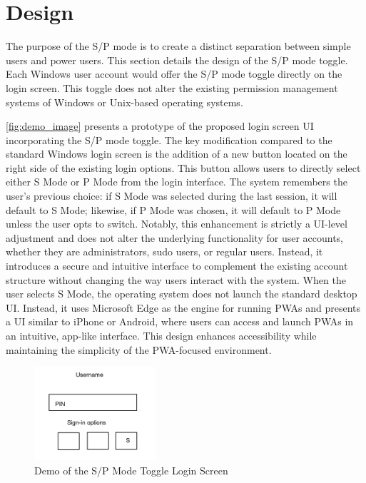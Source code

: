 \section{Design}
\label{sec:methodology}

The purpose of the S/P mode is to create a distinct separation between simple users and power users. This section details the design of the S/P mode toggle. Each Windows user account would offer the S/P mode toggle directly on the login screen. This toggle does not alter the existing permission management systems of Windows or Unix-based operating systems.

\autoref{fig:demo_image} presents a prototype of the proposed login screen UI incorporating the S/P mode toggle. The key modification compared to the standard Windows login screen is the addition of a new button located on the right side of the existing login options. This button allows users to directly select either S Mode or P Mode from the login interface. The system remembers the user’s previous choice: if S Mode was selected during the last session, it will default to S Mode; likewise, if P Mode was chosen, it will default to P Mode unless the user opts to switch. Notably, this enhancement is strictly a UI-level adjustment and does not alter the underlying functionality for user accounts, whether they are administrators, sudo users, or regular users. Instead, it introduces a secure and intuitive interface to complement the existing account structure without changing the way users interact with the system. When the user selects S Mode, the operating system does not launch the standard desktop UI. Instead, it uses Microsoft Edge as the engine for running PWAs and presents a UI similar to iPhone or Android, where users can access and launch PWAs in an intuitive, app-like interface. This design enhances accessibility while maintaining the simplicity of the PWA-focused environment.

\begin{figure}[t] %
\centering
\includegraphics[width=0.4\textwidth]{demo.jpg} %
\caption{Demo of the S/P Mode Toggle Login Screen}
\label{fig:demo_image}
\end{figure}


